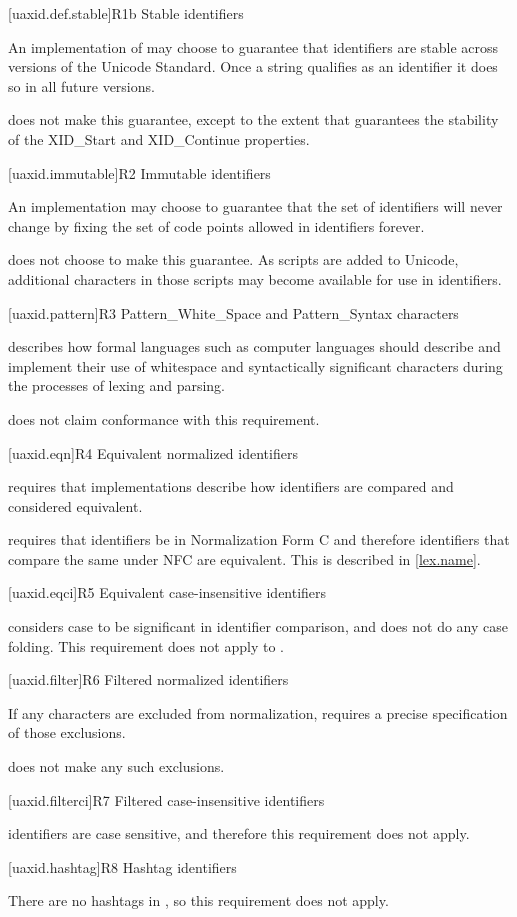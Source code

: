 [uaxid.def.stable]{R1b Stable identifiers}

\pnum
An implementation of  may choose to guarantee
that identifiers are stable across versions of the Unicode Standard.
Once a string qualifies as an identifier it does so in all future versions.

\pnum
\Cpp{} does not make this guarantee,
except to the extent that  guarantees
the stability of the XID_Start and XID_Continue properties.

[uaxid.immutable]{R2 Immutable identifiers}

\pnum
An implementation may choose to guarantee that
the set of identifiers will never change
by fixing the set of code points allowed in identifiers forever.

\pnum
\Cpp{} does not choose to make this guarantee.
As scripts are added to Unicode,
additional characters in those scripts may become available
for use in identifiers.

[uaxid.pattern]{R3 Pattern_White_Space and Pattern_Syntax characters}

\pnum
{} describes how formal languages
such as computer languages should describe and implement
their use of whitespace and syntactically significant characters
during the processes of lexing and parsing.

\pnum
\Cpp{} does not claim conformance with this requirement.

[uaxid.eqn]{R4 Equivalent normalized identifiers}

\pnum
{} requires that implementations describe
how identifiers are compared and considered equivalent.

\pnum
\Cpp{} requires that identifiers be in Normalization Form C and
therefore identifiers that compare the same under NFC are equivalent.
This is described in \ref{lex.name}.

[uaxid.eqci]{R5 Equivalent case-insensitive identifiers}

\pnum
\Cpp{} considers case to be significant in identifier comparison, and
does not do any case folding.
This requirement does not apply to \Cpp{}.

[uaxid.filter]{R6 Filtered normalized identifiers}

\pnum
If any characters are excluded from normalization,
 requires a precise specification of those exclusions.

\pnum
\Cpp{} does not make any such exclusions.

[uaxid.filterci]{R7 Filtered case-insensitive identifiers}

\pnum
\Cpp{} identifiers are case sensitive, and
therefore this requirement does not apply.

[uaxid.hashtag]{R8 Hashtag identifiers}

\pnum
There are no hashtags in \Cpp{}, so this requirement does not apply.
